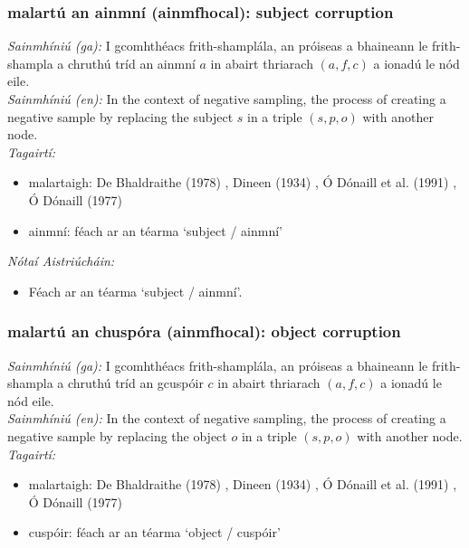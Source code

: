 \subsubsection*{malartú an ainmní (ainmfhocal): subject corruption}
 \noindent \textit{Sainmhíniú (ga):} I gcomhthéacs frith-shamplála, an próiseas a bhaineann le frith-shampla a chruthú tríd an ainmní $a$ in abairt thriarach $(a,f,c)$ a ionadú le nód eile.
\\
 \noindent \textit{Sainmhíniú (en):} In the context of negative sampling, the process of creating a negative sample by replacing the subject $s$ in a triple $(s,p,o)$ with another node.
\\
 \noindent \textit{Tagairtí:}
\begin{itemize}
	\item malartaigh: De Bhaldraithe (1978) \cite{de-bhaldraithe}, Dineen (1934) \cite{dineen}, Ó Dónaill et al. (1991) \cite{focloir-beag}, Ó Dónaill (1977) \cite{odonaill}
	\item ainmní: féach ar an téarma `subject / ainmní'
\end{itemize}

 \noindent \textit{Nótaí Aistriúcháin:}
\begin{itemize}
	\item Féach ar an téarma `subject / ainmní'.
\end{itemize}


\subsubsection*{malartú an chuspóra (ainmfhocal): object corruption}
 \noindent \textit{Sainmhíniú (ga):} I gcomhthéacs frith-shamplála, an próiseas a bhaineann le frith-shampla a chruthú tríd an gcuspóir $c$ in abairt thriarach $(a,f,c)$ a ionadú le nód eile.
\\
 \noindent \textit{Sainmhíniú (en):} In the context of negative sampling, the process of creating a negative sample by replacing the object $o$ in a triple $(s,p,o)$ with another node.
\\
 \noindent \textit{Tagairtí:}
\begin{itemize}
	\item malartaigh: De Bhaldraithe (1978) \cite{de-bhaldraithe}, Dineen (1934) \cite{dineen}, Ó Dónaill et al. (1991) \cite{focloir-beag}, Ó Dónaill (1977) \cite{odonaill}
	\item cuspóir: féach ar an téarma `object / cuspóir'
\end{itemize}

